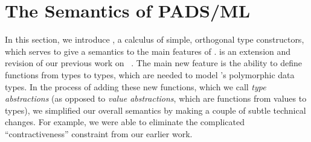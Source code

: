 \section{The Semantics of PADS/ML}
\label{sec:ddc}






In this section, we introduce \ddc{}, a calculus of simple, orthogonal
type constructors, which serves to give a semantics
to the main features of \padsml.  \ddc{} is an extension
and revision of our previous work on 
\ddcold{}~\cite{fisher+:next700ddl}.  The main new feature is 
the ability to define functions from types to types, 
which are needed to model \padsml's polymorphic data types.
In the process of adding these new functions, which we call {\em type
abstractions} (as opposed to {\em value abstractions}, which are functions 
from values to types), we simplified our overall semantics
by making a couple of subtle technical changes.  For example, we were
able to eliminate the complicated ``contractiveness'' constraint from our
earlier work.

